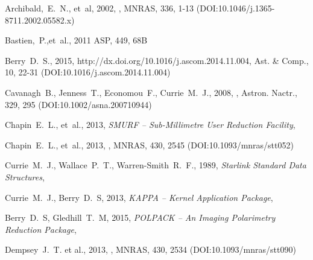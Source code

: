 \documentclass[11pt,oneside,chapters]{starlink}
\begin{document}
\newpage

\newpage

\newpage

\newpage

\newpage

\newpage

\newpage
\begin{thebibliography}{}



Archibald,~E.~N., et~al, 2002, , MNRAS, 336, 1-13
(DOI:10.1046/j.1365-8711.2002.05582.x)

Bastien,~P.,et~al., 2011   ASP, 449, 68B

Berry~D.~S.,  2015,
{http://dx.doi.org/10.1016/j.ascom.2014.11.004},
Ast. \& Comp., 10, 22-31 (DOI:10.1016/j.ascom.2014.11.004)

Cavanagh~B., Jenness~T., Economou~F., Currie~M.~J., 2008,
, Astron. Nactr., 329, 295
(DOI:10.1002/asna.200710944)

Chapin~E.~L., et~al., 2013, \textit{SMURF -- Sub-Millimetre User Reduction
Facility}, 

Chapin~E.~L., et~al., 2013,
,
MNRAS, 430, 2545 (DOI:10.1093/mnras/stt052)

Currie~M.~J., Wallace~P.~T., Warren-Smith~R.~F., 1989,
\textit{Starlink Standard Data Structures}, 

Currie~M.~J., Berry~D.~S, 2013, \textit{KAPPA -- Kernel Application Package},

Berry~D.~S, Gledhill~T.~M, 2015, \textit{POLPACK -- An Imaging Polarimetry Reduction Package},

Dempsey~J.~T. et al., 2013, ,
MNRAS, 430, 2534 (DOI:10.1093/mnras/stt090)


\end{thebibliography}
\end{document}
